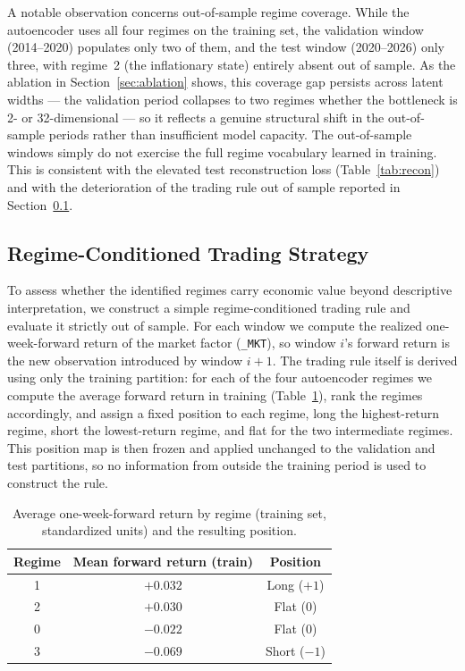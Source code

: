 \documentclass[conference]{IEEEtran}
\begin{document}
A notable observation concerns out-of-sample regime coverage. While the
autoencoder uses all four regimes on the training set, the validation window
(2014--2020) populates only two of them, and the test window (2020--2026) only
three, with regime~2 (the inflationary state) entirely absent out of sample. As
the ablation in Section~\ref{sec:ablation} shows, this coverage gap persists
across latent widths --- the validation period collapses to two regimes whether
the bottleneck is 2- or 32-dimensional --- so it reflects a genuine structural
shift in the out-of-sample periods rather than insufficient model capacity. The
out-of-sample windows simply do not exercise the full regime vocabulary learned
in training. This is consistent with the elevated test reconstruction loss
(Table~\ref{tab:recon}) and with the deterioration of the trading rule out of
sample reported in Section~\ref{sec:strategy}.

\subsection{Regime-Conditioned Trading Strategy}
\label{sec:strategy}

To assess whether the identified regimes carry economic value beyond
descriptive interpretation, we construct a simple regime-conditioned trading
rule and evaluate it strictly out of sample. For each window we compute the
realized one-week-forward return of the market factor (\texttt{\_MKT}), so
window $i$'s forward return is the new observation introduced by window
$i+1$. The trading rule itself is derived using only the training partition:
for each of the four autoencoder regimes we compute the average forward return
in training (Table~\ref{tab:regime-returns}), rank the regimes accordingly, and
assign a fixed position to each regime, long the highest-return regime, short
the lowest-return regime, and flat for the two intermediate regimes. This
position map is then frozen and applied unchanged to the validation and test
partitions, so no information from outside the training period is used to
construct the rule.

\begin{table}[h]
\centering
\caption{Average one-week-forward return by regime (training set, standardized units) and the resulting position.}
\label{tab:regime-returns}
\begin{tabular}{ccc}
\toprule
Regime & Mean forward return (train) & Position \\
\midrule
1 & $+0.032$ & Long ($+1$) \\
2 & $+0.030$ & Flat ($0$) \\
0 & $-0.022$ & Flat ($0$) \\
3 & $-0.069$ & Short ($-1$) \\
\bottomrule
\end{tabular}
\end{table}
\end{document}

